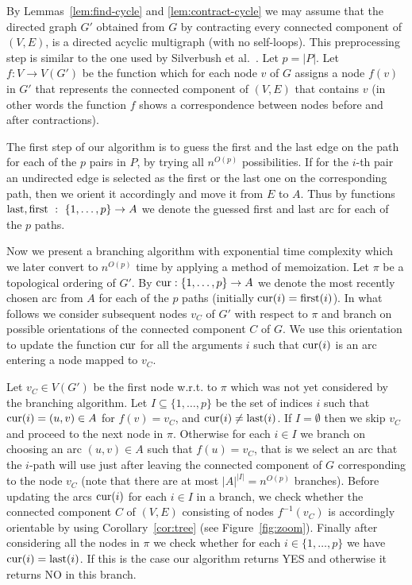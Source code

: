 \documentclass[envcountsame]{llncs}
\begin{document}
By Lemmas~\ref{lem:find-cycle} and \ref{lem:contract-cycle}
we may assume that the directed graph $G'$ obtained from $G$ by contracting every
connected component of $(V,E)$, is a directed acyclic multigraph (with no self-loops).
This preprocessing step is similar to the one used by Silverbush et al.~\cite{silverbush}.
Let $p=|P|$. Let $f:V \rightarrow V(G')$ be the function
which for each node $v$ of $G$ assigns a node $f(v)$ in $G'$
that represents the connected component of $(V,E)$ that contains $v$
(in other words the function $f$ shows a correspondence between
nodes before and after contractions).

The first step of our algorithm is to guess the first and the last edge
on the path for each of the $p$ pairs in $P$, by trying all $n^{O(p)}$ possibilities.
If for the $i$-th pair an undirected edge is selected as the first or the last one
on the corresponding path, then we orient it accordingly and move it from $E$ to $A$.
Thus by functions ${\rm last},{\rm first}\ :\ \{1,\ldots,p\} \rightarrow A$ we denote
the guessed first and last arc for each of the $p$ paths.

Now we present a branching algorithm with exponential time complexity
which we later convert to $n^{O(p)}$ time by applying a method of memoization.
Let $\pi$ be a topological ordering of $G'$.
By ${\rm cur}:\{1,\ldots,p\} \rightarrow A$ we denote the most recently chosen
arc from $A$ for each of the $p$ paths (initially ${\rm cur}(i)={\rm first}(i)$).
In what follows we consider subsequent nodes $v_C$ of $G'$ with respect to $\pi$
and branch on possible orientations of the connected component $C$ of $G$.
We use this orientation to update the function ${\rm cur}$ for all the arguments $i$
such that ${\rm cur}(i)$ is an arc entering a node mapped to $v_C$.

Let $v_C \in V(G')$ be the first node w.r.t. to $\pi$
which was not yet considered by the branching algorithm.
Let $I \subseteq \{1,\ldots,p\}$ be the set of indices $i$ such that ${\rm cur}(i)=(u,v) \in A$ for $f(v)=v_C$,
and ${\rm cur}(i) \not={\rm last}(i)$.
If $I=\emptyset$ then we skip $v_C$ and proceed to the next node in $\pi$.
Otherwise for each $i \in I$ we branch on choosing an arc $(u,v) \in A$ such that $f(u)=v_C$,
that is we select an arc that the $i$-path will use just after leaving the connected component of $G$
corresponding to the node $v_C$ (note that there are at most $|A|^{|I|}=n^{O(p)}$ branches).
Before updating the arcs ${\rm cur}(i)$ for each $i\in I$ in a branch, we check whether the connected component $C$
of $(V,E)$ consisting of nodes $f^{-1}(v_C)$ is accordingly orientable by using Corollary~\ref{cor:tree} (see Figure~\ref{fig:zoom}).
Finally after considering all the nodes in $\pi$ we check whether for each $i \in \{1,\ldots,p\}$ 
we have ${\rm cur}(i) = {\rm last}(i)$.
If this is the case our algorithm returns YES and otherwise it returns NO in this branch.
\end{document}

